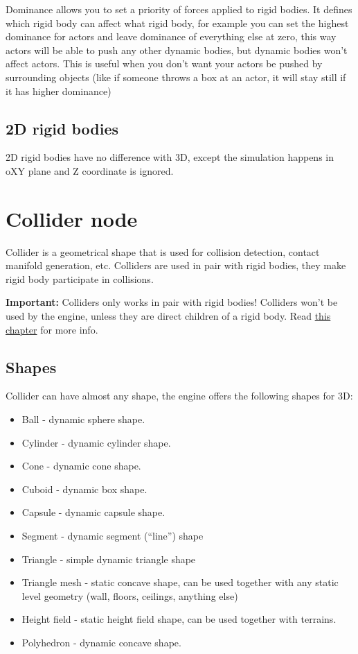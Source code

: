 \documentclass[
]{book}
\providecommand{\tightlist}{%
  \setlength{\itemsep}{0pt}\setlength{\parskip}{0pt}}
\theoremstyle{definition}
\theoremstyle{definition}
\theoremstyle{definition}
\theoremstyle{definition}
\theoremstyle{remark}
\begin{document}
Dominance allows you to set a priority of forces applied to rigid bodies. It defines which rigid body can affect what rigid body, for example you can set the highest dominance for actors and leave dominance of everything else at zero, this way actors will be able to push any other dynamic bodies, but dynamic bodies won't affect actors. This is useful when you don't want your actors be pushed by surrounding objects (like if someone throws a box at an actor, it will stay still if it has higher dominance)

\subsection{2D rigid bodies}\label{d-rigid-bodies}

2D rigid bodies have no difference with 3D, except the simulation happens in oXY plane and Z coordinate is ignored.

\section{Collider node}\label{collider-node}

Collider is a geometrical shape that is used for collision detection, contact manifold generation, etc. Colliders are used in pair with rigid bodies, they make rigid body participate in collisions.

\textbf{Important:} Colliders only works in pair with rigid bodies! Colliders won't be used by the engine, unless they are direct children of a rigid body. Read \href{./rigid_body.md\#colliders}{this chapter} for more info.

\subsection{Shapes}\label{shapes}

Collider can have almost any shape, the engine offers the following shapes for 3D:

\begin{itemize}
\tightlist
\item
  Ball - dynamic sphere shape.
\item
  Cylinder - dynamic cylinder shape.
\item
  Cone - dynamic cone shape.
\item
  Cuboid - dynamic box shape.
\item
  Capsule - dynamic capsule shape.
\item
  Segment - dynamic segment (``line'') shape
\item
  Triangle - simple dynamic triangle shape
\item
  Triangle mesh - static concave shape, can be used together with any static level geometry (wall, floors, ceilings,
  anything else)
\item
  Height field - static height field shape, can be used together with terrains.
\item
  Polyhedron - dynamic concave shape.
\end{itemize}
\end{document}
